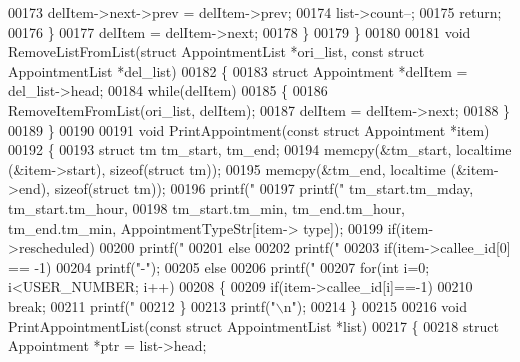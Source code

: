 \begin{DoxyCode}
00173                 delItem->next->prev = delItem->prev;
00174             list->count--;
00175             \textcolor{keywordflow}{return};
00176         \}
00177         delItem = delItem->next;
00178     \}
00179 \}
00180 
00181 \textcolor{keywordtype}{void} RemoveListFromList(\textcolor{keyword}{struct} AppointmentList *ori\_list, \textcolor{keyword}{const} \textcolor{keyword}{struct} 
      AppointmentList *del\_list)
00182 \{
00183     \textcolor{keyword}{struct }Appointment *delItem = del\_list->head;
00184     \textcolor{keywordflow}{while}(delItem)
00185     \{
00186         RemoveItemFromList(ori\_list, delItem);
00187         delItem = delItem->next;
00188     \}
00189 \}
00190 
00191 \textcolor{keywordtype}{void} PrintAppointment(\textcolor{keyword}{const} \textcolor{keyword}{struct} Appointment *item)
00192 \{
00193     \textcolor{keyword}{struct }tm tm\_start, tm\_end;
00194     memcpy(&tm\_start, localtime (&item->start), \textcolor{keyword}{sizeof}(\textcolor{keyword}{struct} tm));
00195     memcpy(&tm\_end, localtime (&item->end), \textcolor{keyword}{sizeof}(\textcolor{keyword}{struct} tm));
00196     printf(\textcolor{stringliteral}{"%
00197     printf(\textcolor{stringliteral}{"%
      tm\_start.tm\_mday, tm\_start.tm\_hour,
00198      tm\_start.tm\_min, tm\_end.tm\_hour, tm\_end.tm\_min, AppointmentTypeStr[item->
      type]);
00199     \textcolor{keywordflow}{if}(item->rescheduled)
00200         printf(\textcolor{stringliteral}{"%
00201     \textcolor{keywordflow}{else}
00202         printf(\textcolor{stringliteral}{"%
00203     \textcolor{keywordflow}{if}(item->callee_id[0] == -1)
00204         printf(\textcolor{stringliteral}{"-"});
00205     \textcolor{keywordflow}{else}
00206         printf(\textcolor{stringliteral}{"%
00207     \textcolor{keywordflow}{for}(\textcolor{keywordtype}{int} i=0; i<USER_NUMBER; i++)
00208     \{
00209         \textcolor{keywordflow}{if}(item->callee_id[i]==-1)
00210             \textcolor{keywordflow}{break};
00211         printf(\textcolor{stringliteral}{"%
00212     \}
00213     printf(\textcolor{stringliteral}{"\(\backslash\)n"});
00214 \}
00215 
00216 \textcolor{keywordtype}{void} PrintAppointmentList(\textcolor{keyword}{const} \textcolor{keyword}{struct} AppointmentList *list)
00217 \{
00218     \textcolor{keyword}{struct }Appointment *ptr = list->head;
}}}}}}
\end{DoxyCode}
